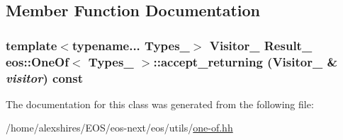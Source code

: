 \subsection{Member Function Documentation}
\hypertarget{classeos_1_1OneOf_a2d12b36c583fe6967f6a31ac65b066c9}{
\subsubsection[{accept\_\-returning}]{\setlength{\rightskip}{0pt plus 5cm}template$<$typename... Types\_\-$>$ Visitor\_\- Result\_\- {\bf eos::OneOf}$<$ Types\_\- $>$::accept\_\-returning (Visitor\_\- \& {\em visitor}) const}}
\label{classeos_1_1OneOf_a2d12b36c583fe6967f6a31ac65b066c9}


The documentation for this class was generated from the following file:\begin{DoxyCompactItemize}
\item 
/home/alexshires/EOS/eos-\/next/eos/utils/\hyperlink{one-of_8hh}{one-\/of.hh}\end{DoxyCompactItemize}
